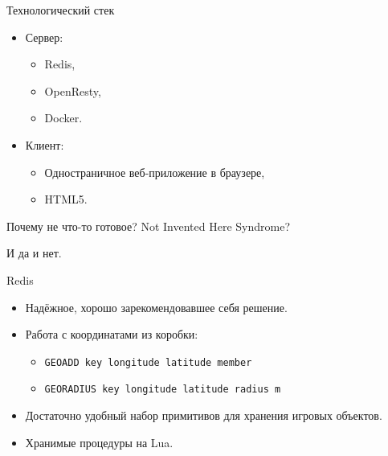 \documentclass[aspectratio=169,handout,bigger]{beamer}
\begin{document}
\begin{frame}{Технологический стек}
  \begin{itemize}
    \item Сервер:
    \begin{itemize}
      \item Redis,
      \item OpenResty,
      \item Docker.
    \end{itemize}
    \item Клиент:
    \begin{itemize}
      \item Одностраничное веб-приложение в браузере,
      \item HTML5.
    \end{itemize}
  \end{itemize}
\end{frame}


\begin{frame}{Почему не что-то готовое?}
  Not Invented Here Syndrome?
  \vspace*{1em}\par
  И да и нет.
\end{frame}


\begin{frame}{Redis}
  \begin{itemize}
    \item Надёжное, хорошо зарекомендовавшее себя решение.
    \item Работа с координатами из коробки:
    \begin{itemize}
      \item \texttt{GEOADD key longitude latitude member}
      \item \texttt{GEORADIUS key longitude latitude radius m}
    \end{itemize}
    \item Достаточно удобный набор примитивов для хранения игровых объектов.
    \item Хранимые процедуры на Lua.
  \end{itemize}
\end{frame}

\end{document}
